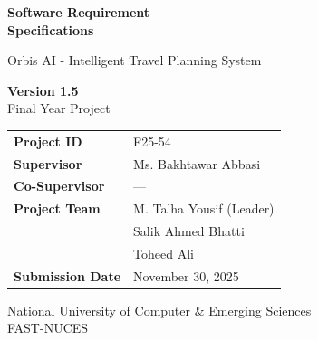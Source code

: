 \documentclass[12pt,a4paper]{article}
\begin{document}
\begin{titlepage}
    \centering
    \vspace*{2cm}
    
    {\Huge\bfseries\color{primaryblue}Software Requirement\\[0.3cm]Specifications\par}
    \vspace{1cm}
    {\LARGE\color{darkgray}Orbis AI - Intelligent Travel Planning System\par}
    \vspace{2cm}
    
    \begin{tcolorbox}[
        colback=primaryblue!5,
        colframe=primaryblue,
        width=10cm,
        arc=3mm,
        boxrule=1pt
    ]
        \centering
        {\Large\textbf{Version 1.5}}\\[0.3cm]
        {\large Final Year Project}
    \end{tcolorbox}
    
    \vspace{2cm}
    
\newcommand{\myrule}{\noalign{\vskip 2pt}\hline\noalign{\vskip 2pt}}

\begin{tcolorbox}[
    colback=white,
    colframe=primaryblue,
    width=15cm,
    arc=3mm,
    boxrule=1.5pt
]
    \renewcommand{\arraystretch}{1.4}
    \begin{tabular}{L{4cm}L{9cm}}
        \textbf{\color{primaryblue}Project ID} & F25-54 \\ \myrule
        \textbf{\color{primaryblue}Supervisor} & Ms. Bakhtawar Abbasi \\ \myrule
        \textbf{\color{primaryblue}Co-Supervisor} & --- \\ \myrule
        \textbf{\color{primaryblue}Project Team} & M. Talha Yousif (Leader)\\
        & Salik Ahmed Bhatti\\
        & Toheed Ali \\ \myrule
        \textbf{\color{primaryblue}Submission Date} & November 30, 2025 \\
    \end{tabular}
\end{tcolorbox}


    
    \vfill
    
    {\large\color{mediumgray}National University of Computer \& Emerging Sciences\\
    FAST-NUCES\par}
    
\end{titlepage}
\end{document}
